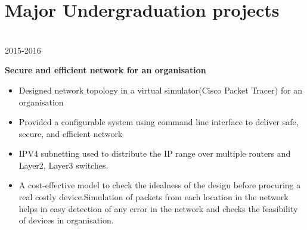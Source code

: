 \documentclass[letterpaper]{twentysecondcv} %
\begin{document}
        \section*{{\color{pblue}\LARGE Major Undergraduation projects}}
        \vspace{-6mm}
        \begin{twentyshort}
            \\
        	\twentyitemshort
            	{2015-2016}
                {\hspace{0.5em}\textbf{Secure and efficient network for an organisation}
                    \begin{itemize}
                        \item Designed network topology in a virtual simulator(Cisco Packet Tracer) for an organisation
                        \item Provided a configurable system using command line interface to deliver safe, secure, and efficient network
                        \item IPV4 subnetting used to distribute the IP range over multiple routers and Layer2, Layer3 switches.
                        \item A cost-effective model to check the idealness of the design before procuring a real costly device.Simulation of packets from each location in the network helps in easy detection of any error in the network and checks the feasibility of devices in organisation. 
                    \end{itemize}
                }
        \end{twentyshort}
        
        \vspace{-5mm}
\end{document}
